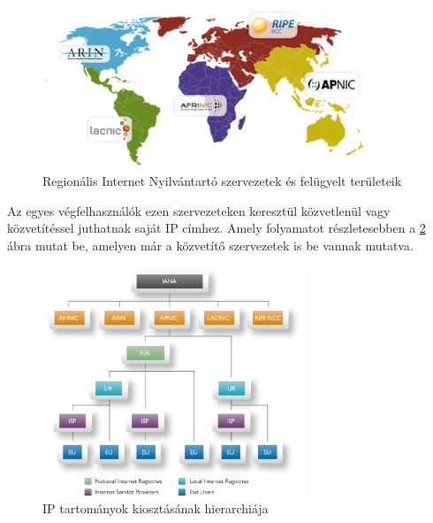 \begin{figure}[!ht]
	\centering
	\includegraphics[width=0.9\textwidth, keepaspectratio]{figures/rir-regions.png}
	\caption{Regionális Internet Nyilvántartó szervezetek és felügyelt területeik \protect\footnotemark}
	\label{fig:rir-regions}
\end{figure}


\newpage

Az egyes végfelhasználók ezen szervezeteken keresztül közvetlenül vagy közvetítéssel juthatnak saját IP címhez. Amely folyamatot részletesebben a \ref{fig:ipv4_hierarchy} ábra mutat be, amelyen már a közvetítő szervezetek is be vannak mutatva.

\begin{figure}[!ht]
	\centering
	\includegraphics[width=0.7\textwidth, keepaspectratio]{figures/ipv4_hierarchy.png}
	\caption{IP tartományok kiosztásának hierarchiája\protect\footnotemark}
	\label{fig:ipv4_hierarchy}
\end{figure}



